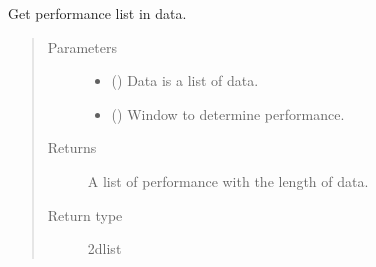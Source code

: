 \documentclass[letterpaper,10pt,english]{sphinxmanual}
\begin{document}
\begin{fulllineitems}
\label{\detokenize{NoSeMazeControl/Analysis:Analysis.Performance.get_performance}}
\pysigstartsignatures
{}
\pysigstopsignatures
\sphinxAtStartPar
Get performance list in data.
\begin{quote}\begin{description}
\item[{Parameters}] \leavevmode\begin{itemize}
\item {} 
\sphinxAtStartPar
{} () \textendash{} Data is a list of data.

\item {} 
\sphinxAtStartPar
{} () \textendash{} Window to determine performance.

\end{itemize}

\item[{Returns}] \leavevmode
\sphinxAtStartPar
{} \textendash{} A list of performance with the length of data.

\item[{Return type}] \leavevmode
\sphinxAtStartPar
2d\sphinxhyphen{}list

\end{description}\end{quote}

\end{fulllineitems}

\end{document}
